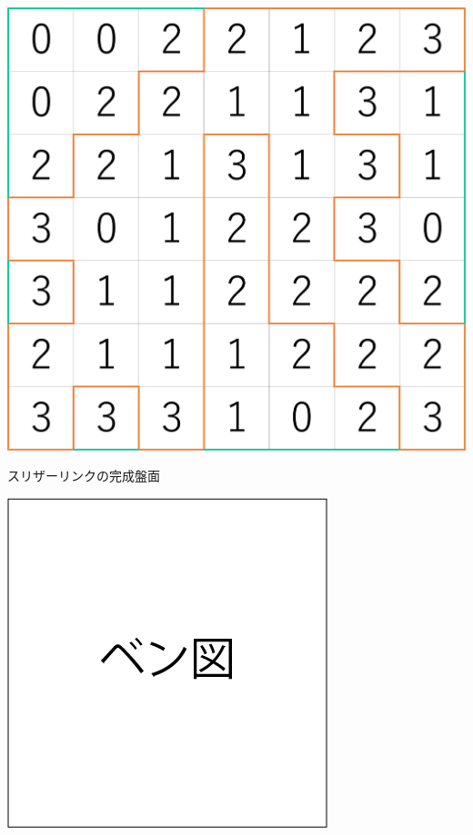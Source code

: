 \begin{clearpagefigure}
  \includegraphics[width=0.8\linewidth,clip]{fig/slitherlink.png}
  \caption{スリザーリンクの完成盤面}
  \label{figure:SlitherLink}
\end{clearpagefigure}

\begin{clearpagefigure}
  \includegraphics[width=0.8\linewidth,clip]{fig/vennDiagram.png}
  \caption{}
  \label{figure:VennDiagram}
\end{clearpagefigure}

